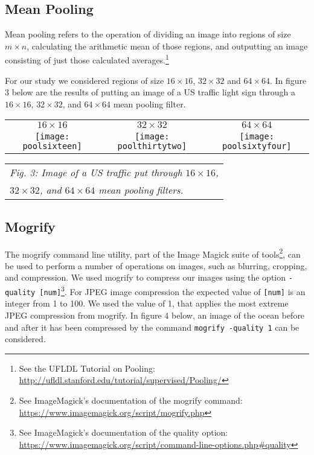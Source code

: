 \documentclass[letterpaper, 12 pt, conference]{ieeeconf}  %
\begin{document}
\subsection{Mean Pooling}
Mean pooling refers to the operation of dividing
an image into regions of size $m \times n$, calculating
the arithmetic mean of those regions, and outputting
an image consisting of just those calculated averages.\footnote{See the UFLDL Tutorial on Pooling: \url{http://ufldl.stanford.edu/tutorial/supervised/Pooling/}}

For our study we considered regions of size $16 \times 16$, $32 \times 32$ and $64 \times 64$.
In figure 3 below are the results of putting an image of a US traffic light sign through
a $16 \times 16$, $32 \times 32$, and $64 \times 64$ mean pooling filter.

\vspace*{3mm}
\begin{tabular}{c c c}
	$16 \times 16$ & $32 \times 32$ & $64 \times 64$ \\
	\texttt{[image: poolsixteen]} &
		\texttt{[image: poolthirtytwo]} &
		\texttt{[image: poolsixtyfour]} \\
\end{tabular}
\begin{tabular}{l}
    {\it \hspace*{4mm} Fig. 3: Image of a US traffic put through $16 \times 16$,} \\
    {\it \hspace*{4mm} $32 \times 32$, and $64 \times 64$ mean pooling filters.} \\
\end{tabular}

\subsection{Mogrify}
The mogrify command line utility, part of the Image Magick suite of tools\footnote{See ImageMagick's documentation of the mogrify command: \url{https://www.imagemagick.org/script/mogrify.php}}, can be used to perform a number of operations
on images, such as blurring, cropping, and compression.
We used mogrify to compress our images using the option {\tt -quality [num]}\footnote{See ImageMagick's documentation of the quality option: \url{https://www.imagemagick.org/script/command-line-options.php\#quality}}. For JPEG image compression the expected value of {\tt [num]} is an integer from 1 to 100. We used the value of 1, that applies the most extreme JPEG compression from mogrify.
In figure 4 below, an image of the ocean before and after it has been compressed by the command {\tt mogrify -quality 1} can be considered.
\end{document}
